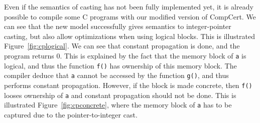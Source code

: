 Even if the semantics of casting has not been fully implemented yet, it is already possible to compile some C programs with our modified version of CompCert. We can see that the new model successfully gives semantics to integer-pointer casting, but also allow optimizations when using logical blocks.
This is illustrated Figure~\ref{fig:cplogical}. We can see that constant propagation is done, and the program returns 0. This is explained by the fact that the memory block of \texttt{a} is logical, and thus the function \texttt{f()} has ownership of this memory block. The compiler deduce that \texttt{a} cannot be accessed by the function \texttt{g()}, and thus performs constant propagation.
However, if the block is made concrete, then \texttt{f()} looses ownership of \texttt{a} and constant propagation should not be done. This is illustrated Figure~\ref{fig:cpconcrete}, where the memory block of \texttt{a} has to be captured due to the pointer-to-integer cast.
